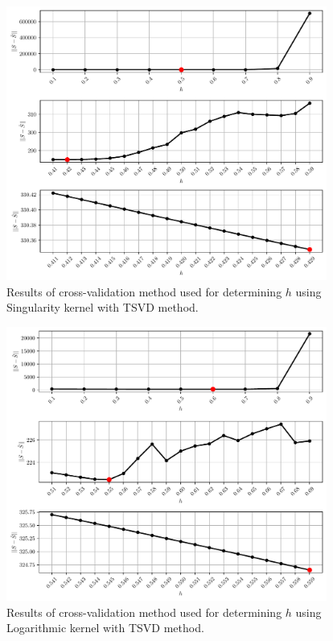 \documentclass[12pt]{article}
\begin{document}
	\begin{figure}[h!]
		\centering
		\includegraphics[height=9cm]{../Outputs/Plots/CV_Singularity_TSVD.pdf}
		\caption{Results of cross-validation method used for determining $h$ using Singularity kernel with TSVD method.}
		\label{fig:CV_Singularity_TSVD}
	\end{figure}
	
	\begin{figure}[h!]
		\centering
		\includegraphics[height=9cm]{../Outputs/Plots/CV_Logarithmic_TSVD.pdf}
		\caption{Results of cross-validation method used for determining $h$ using Logarithmic kernel with TSVD method.}
		\label{fig:CV_Logarithmic_TSVD}
	\end{figure}
	
	\clearpage
	
	
\end{document}
